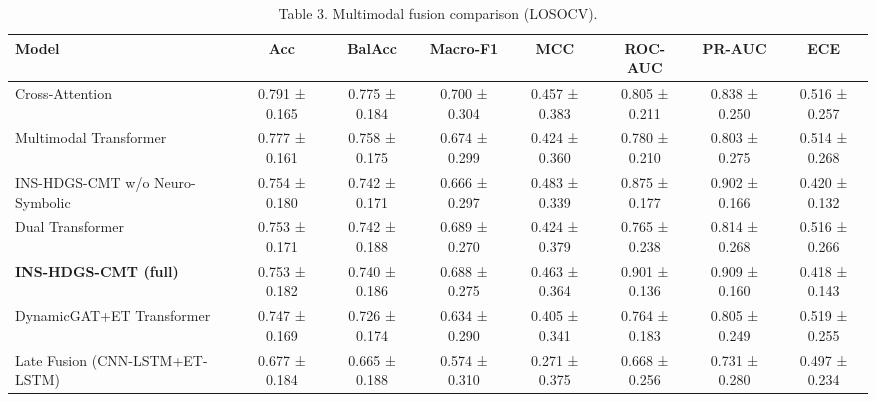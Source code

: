 \begin{table}[t]
\centering
\caption{Table 3. Multimodal fusion comparison (LOSOCV).}
\label{tab:table3_fusion}
\begin{tabular}{lccccccc}
\hline
Model & Acc & BalAcc & Macro-F1 & MCC & ROC-AUC & PR-AUC & ECE \\
\hline
Cross-Attention & 0.791 ± 0.165 & 0.775 ± 0.184 & 0.700 ± 0.304 & 0.457 ± 0.383 & 0.805 ± 0.211 & 0.838 ± 0.250 & 0.516 ± 0.257 \\
Multimodal Transformer & 0.777 ± 0.161 & 0.758 ± 0.175 & 0.674 ± 0.299 & 0.424 ± 0.360 & 0.780 ± 0.210 & 0.803 ± 0.275 & 0.514 ± 0.268 \\
INS-HDGS-CMT w/o Neuro-Symbolic & 0.754 ± 0.180 & 0.742 ± 0.171 & 0.666 ± 0.297 & 0.483 ± 0.339 & 0.875 ± 0.177 & 0.902 ± 0.166 & 0.420 ± 0.132 \\
Dual Transformer & 0.753 ± 0.171 & 0.742 ± 0.188 & 0.689 ± 0.270 & 0.424 ± 0.379 & 0.765 ± 0.238 & 0.814 ± 0.268 & 0.516 ± 0.266 \\
\textbf{INS-HDGS-CMT (full)} & 0.753 ± 0.182 & 0.740 ± 0.186 & 0.688 ± 0.275 & 0.463 ± 0.364 & 0.901 ± 0.136 & 0.909 ± 0.160 & 0.418 ± 0.143 \\
DynamicGAT+ET Transformer & 0.747 ± 0.169 & 0.726 ± 0.174 & 0.634 ± 0.290 & 0.405 ± 0.341 & 0.764 ± 0.183 & 0.805 ± 0.249 & 0.519 ± 0.255 \\
Late Fusion (CNN-LSTM+ET-LSTM) & 0.677 ± 0.184 & 0.665 ± 0.188 & 0.574 ± 0.310 & 0.271 ± 0.375 & 0.668 ± 0.256 & 0.731 ± 0.280 & 0.497 ± 0.234 \\
\hline
\end{tabular}
\end{table}
